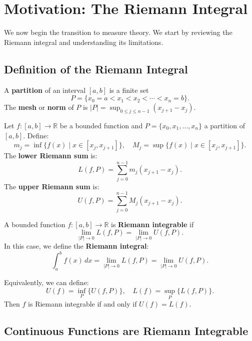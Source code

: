 \documentclass[11pt]{report}
\begin{document}
\section{Motivation: The Riemann Integral}

We now begin the transition to measure theory. We start by reviewing the Riemann integral and understanding its limitations.

\subsection{Definition of the Riemann Integral}

\begin{defbox}[Partition]
A \textbf{partition} of an interval $[a, b]$ is a finite set
\[
P = \{x_0 = a < x_1 < x_2 < \cdots < x_n = b\}.
\]
The \textbf{mesh} or \textbf{norm} of $P$ is $|P| = \sup_{0 \leq j \leq n-1} (x_{j+1} - x_j)$.
\end{defbox}

\begin{defbox}
Let $f: [a, b] \to \mathbb{R}$ be a bounded function and $P = \{x_0, x_1, \ldots, x_n\}$ a partition of $[a, b]$. Define:
\[
m_j = \inf\{f(x) \mid x \in [x_j, x_{j+1}]\}, \quad M_j = \sup\{f(x) \mid x \in [x_j, x_{j+1}]\}.
\]
The \textbf{lower Riemann sum} is:
\[
L(f, P) = \sum_{j=0}^{n-1} m_j (x_{j+1} - x_j).
\]
The \textbf{upper Riemann sum} is:
\[
U(f, P) = \sum_{j=0}^{n-1} M_j (x_{j+1} - x_j).
\]
\end{defbox}

\begin{defbox}
A bounded function $f: [a, b] \to \mathbb{R}$ is \textbf{Riemann integrable} if
\[
\lim_{|P| \to 0} L(f, P) = \lim_{|P| \to 0} U(f, P).
\]
In this case, we define the \textbf{Riemann integral}:
\[
\int_a^b f(x) \, dx = \lim_{|P| \to 0} L(f, P) = \lim_{|P| \to 0} U(f, P).
\]
\end{defbox}

\begin{rembox}
Equivalently, we can define:
\[
U(f) = \inf_P \{U(f, P)\}, \quad L(f) = \sup_P \{L(f, P)\}.
\]
Then $f$ is Riemann integrable if and only if $U(f) = L(f)$.
\end{rembox}

\subsection{Continuous Functions are Riemann Integrable}
\end{document}
